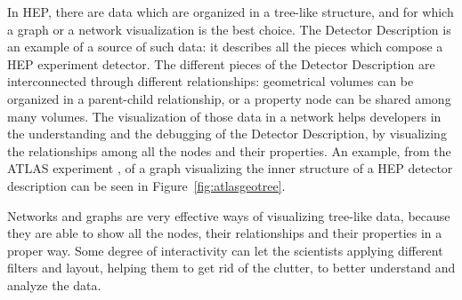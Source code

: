 \documentclass[12pt,a4paper]{article}
\begin{document}
In HEP, there are data which are organized in a tree-like structure, and for which a graph or a network visualization is the best choice.
The Detector Description is an example of a source of such data: it describes all the pieces which compose a HEP experiment detector.
The different pieces of the Detector Description are interconnected through different relationships: geometrical volumes can be organized
in a parent-child relationship, or a property node can be shared among many volumes. The visualization of those data in a network helps
developers in the understanding and the debugging of the Detector Description, by visualizing the relationships among all the nodes and
their properties. An example, from the ATLAS experiment \cite{ATLASGeoModel2017}, of a graph visualizing the inner
structure of a HEP detector description can be seen in Figure~\ref{fig:atlasgeotree}. 

Networks and graphs are very effective ways of visualizing tree-like data, because they are able to show all the 	nodes, their relationships and their properties in a proper way. Some degree of interactivity can let the scientists applying different filters and layout, helping them to get rid of the clutter, to better understand and analyze the data.
\end{document}
